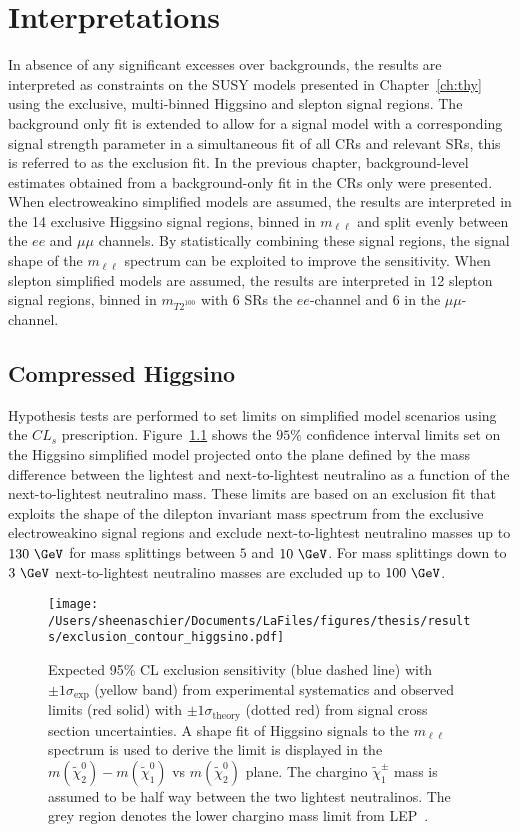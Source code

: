 \chapter{Interpretations}
\label{ch:interpretations}

In absence of any significant excesses over backgrounds, the results are interpreted as constraints on the SUSY models presented in Chapter~\ref{ch:thy} using the exclusive, multi-binned Higgsino and slepton signal regions.  The background only fit is extended to allow for a signal model with a corresponding signal strength parameter in a simultaneous fit of all CRs and relevant SRs, this is referred to as the exclusion fit.  In the previous chapter, background-level estimates obtained from a background-only fit in the CRs only were presented.  When electroweakino simplified models are assumed, the results are interpreted in the 14 exclusive Higgsino signal regions, binned in $m_{\ell\ell}$ and split evenly between the $ee$ and $\mu\mu$ channels.  By statistically combining these signal regions, the signal shape of the $m_{\ell\ell}$ spectrum can be exploited to improve the sensitivity. When slepton simplified models are assumed, the results are interpreted in 12 slepton signal regions, binned in $m_{T2^{100}}$ with 6 SRs the $ee$-channel and 6 in the $\mu\mu$-channel.

\section{Compressed Higgsino}
Hypothesis tests are performed to set limits on simplified model scenarios using the $CL_s$ prescription.  Figure~\ref{fig:exclusion_contour_higgsino} shows the $95\%$ confidence interval limits set on the Higgsino simplified model projected onto the plane defined by the mass difference between the lightest and next-to-lightest neutralino as a function of the next-to-lightest neutralino mass.  These limits are based on an exclusion fit that exploits the shape of the dilepton invariant mass spectrum from the exclusive electroweakino signal regions and exclude next-to-lightest neutralino masses up to $130~\GeV$ for mass splittings between $5$ and $10~\GeV$.  For mass splittings down to $3~\GeV$ next-to-lightest neutralino masses are excluded up to $100~\GeV$. 

 \begin{figure}
 \centering
 \texttt{[image: /Users/sheenaschier/Documents/LaFiles/figures/thesis/results/exclusion\_contour\_higgsino.pdf]}
  \caption{
 Expected 95\% CL exclusion sensitivity (blue dashed line) with $\pm 1 \sigma_\text{exp}$ (yellow band) from experimental systematics
   and observed limits (red solid) with $\pm 1 \sigma_\text{theory}$ (dotted red) from signal cross section uncertainties.
A shape fit of Higgsino signals to the $m_{\ell\ell}$ spectrum is used to derive
 the limit is displayed in the $m(\tilde{\chi}^0_2) - m(\tilde{\chi}^0_1)$ vs $m(\tilde{\chi}^0_2)$ plane.
 The chargino $\tilde{\chi}^\pm_1$ mass is assumed to be half way between the two lightest neutralinos.
  The grey region denotes the lower chargino mass limit from LEP~\cite{LEPlimits}.}
   \label{fig:exclusion_contour_higgsino}
 \end{figure}
 
